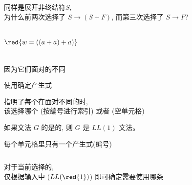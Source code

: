 \begin{frame}{}
  \begin{center}
    同样是展开非终结符$S$, \\[4pt]
    为什么前两次选择了 $S \to (S + F)$, 而第三次选择了 $S \to F$?

    \begin{columns}
        

        \vspace{-0.80cm}
        \[
          \red{w = ((a + a) + a)}
        \]
    \end{columns}

    \pause
    \vspace{0.50cm}
    因为它们面对的不同
  \end{center}
\end{frame}

\begin{frame}{}
  \begin{center}
    {\large 使用确定产生式}
    

    
    指明了每个在面对不同的时, \\[4pt]
    该选择哪个 (按编号进行索引) 或者 (空单元格)
  \end{center}
\end{frame}

\begin{frame}{}
  \begin{center}
    \begin{definition}[$LL(1)$文法]
      如果文法 $G$ 的是的,
      则 $G$ 是 $LL(1)$ 文法。
    \end{definition}

     每个单元格里只有一个产生式(编号) \\[8pt]

    \begin{columns}
        
        
    \end{columns}

    \vspace{0.60cm}
    对于当前选择的, \\[4pt]
    仅根据输入中 ($LL(\red{1})$) 即可确定需要使用哪条
  \end{center}
\end{frame}

